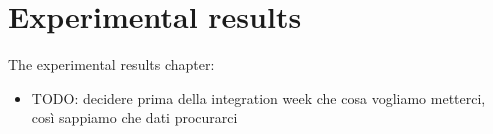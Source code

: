 
\chapter{Experimental results} \label{chap:experimentalResults}

The experimental results chapter:
\begin{itemize}
	\item TODO: decidere prima della integration week che cosa vogliamo metterci, così sappiamo che dati procurarci
\end{itemize}